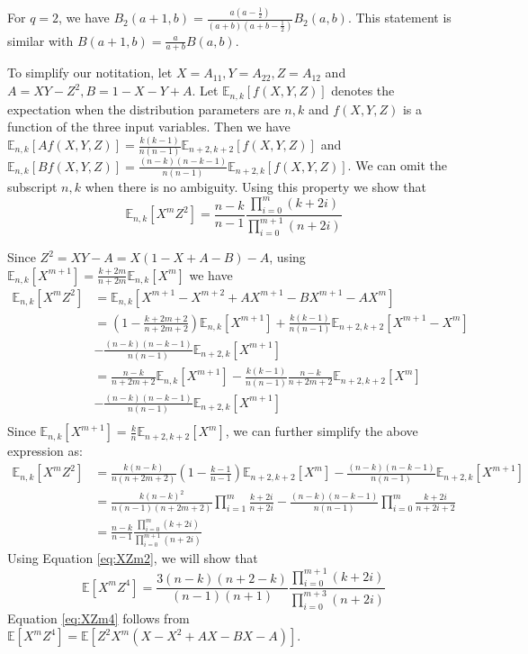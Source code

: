 \documentclass{article}
\def\E{\mathbb{E}}
\begin{document}
For $q=2$, we have $B_2(a+1,b)=\frac{a(a-\frac{1}{2})}{(a+b)(a+b-\frac{1}{2})} B_2(a,b)$. This statement is similar with
$B(a+1,b) = \frac{a}{a+b}B(a,b)$.

To simplify our notitation, let $X = A_{11}, Y = A_{22}, Z = A_{12}$ and $A = XY - Z^2, B = 1 - X - Y + A$. Let $\E_{n,k}[f(X,Y,Z)]$ denotes the expectation when the distribution parameters are $n, k$ and $f(X,Y,Z)$ is a function of the three input variables. Then we have $\E_{n,k}[Af(X,Y,Z)] = \frac{k(k-1)}{n(n-1)}\E_{n+2,k+2}[f(X,Y,Z)]$ and $\E_{n,k}[Bf(X,Y,Z)] = \frac{(n-k)(n-k-1)}{n(n-1)}\E_{n+2, k}[f(X,Y,Z)]$. We can omit the subscript $n,k$ when there is no ambiguity.
Using this property we show that
\begin{equation}\label{eq:XZm2}
\E_{n,k}[X^m Z^2] = \frac{n-k}{n-1}\frac{\prod_{i=0}^m (k+2i)}{\prod_{i=0}^{m+1} (n+2i)}
\end{equation}

Since $Z^2 = XY - A = X(1-X+A-B)-A$, using $\E_{n,k}[X^{m+1}] = \frac{k+2m}{n+2m}\E_{n,k}[X^m]$ we have
\begin{align*}
\E_{n,k}[X^m Z^2] & = \E_{n,k}[X^{m+1}-X^{m+2}+AX^{m+1}-BX^{m+1}-AX^m] \\
& = (1-\frac{k+2m+2}{n+2m+2})\E_{n,k}[X^{m+1}] + \frac{k(k-1)}{n(n-1)}\E_{n+2,k+2}[X^{m+1} - X^m]\\
& - \frac{(n-k)(n-k-1)}{n(n-1)} \E_{n+2,k}[X^{m+1}] \\
& = \frac{n-k}{n+2m+2}\E_{n,k}[X^{m+1}] - \frac{k(k-1)}{n(n-1)}\frac{n-k}{n+2m+2}\E_{n+2,k+2}[X^m] \\
& - \frac{(n-k)(n-k-1)}{n(n-1)} \E_{n+2,k}[X^{m+1}] \\
\end{align*}
Since $\E_{n,k}[X^{m+1}] = \frac{k}{n}\E_{n+2,k+2}[X^m]$, we can further simplify the above expression as:
\begin{align*}
\E_{n,k}[X^m Z^2] &= \frac{k(n-k)}{n(n+2m+2)}(1-\frac{k-1}{n-1})\E_{n+2,k+2}[X^m]- \frac{(n-k)(n-k-1)}{n(n-1)} \E_{n+2,k}[X^{m+1}]\\
& = \frac{k(n-k)^2}{n(n-1)(n+2m+2)}\prod_{i=1}^m \frac{k+2i}{n+2i} - \frac{(n-k)(n-k-1)}{n(n-1)}\prod_{i=0}^m \frac{k+2i}{n+2i+2} \\
& = \frac{n-k}{n-1}\frac{\prod_{i=0}^m (k+2i)}{\prod_{i=0}^{m+1} (n+2i)}
\end{align*}
Using Equation \eqref{eq:XZm2}, we will show that
\begin{equation}\label{eq:XZm4}
\E[X^m Z^4] = \frac{3(n-k)(n+2-k)}{(n-1)(n+1)} \frac{\prod_{i=0}^{m+1} (k+2i)}{\prod_{i=0}^{m+3} (n+2i)}
\end{equation}
Equation \eqref{eq:XZm4} follows from $\E[X^m Z^4 ] = \E[Z^2 X^m(X-X^2 +AX-BX-A)]$.
\end{document}
